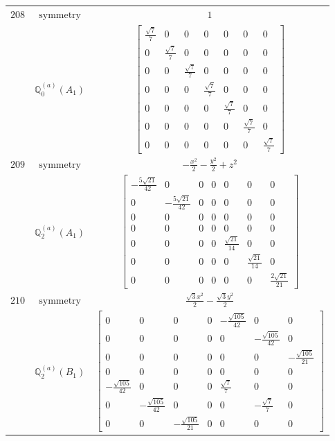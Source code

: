 \documentclass[fleqn,8pt,landscape]{jsarticle}
\begin{document}
\begin{longtable}{ccc}
$ 208 $ & $ \text{symmetry} $ & $ 1 $ \\
$  $ & $ \mathbb{Q}_{0}^{(a)}(A_{1}) $ & $ \begin{bmatrix} \frac{\sqrt{7}}{7} & 0 & 0 & 0 & 0 & 0 & 0 \\ 0 & \frac{\sqrt{7}}{7} & 0 & 0 & 0 & 0 & 0 \\ 0 & 0 & \frac{\sqrt{7}}{7} & 0 & 0 & 0 & 0 \\ 0 & 0 & 0 & \frac{\sqrt{7}}{7} & 0 & 0 & 0 \\ 0 & 0 & 0 & 0 & \frac{\sqrt{7}}{7} & 0 & 0 \\ 0 & 0 & 0 & 0 & 0 & \frac{\sqrt{7}}{7} & 0 \\ 0 & 0 & 0 & 0 & 0 & 0 & \frac{\sqrt{7}}{7} \end{bmatrix} $ \\ \hline
$ 209 $ & $ \text{symmetry} $ & $ - \frac{x^{2}}{2} - \frac{y^{2}}{2} + z^{2} $ \\
$  $ & $ \mathbb{Q}_{2}^{(a)}(A_{1}) $ & $ \begin{bmatrix} - \frac{5 \sqrt{21}}{42} & 0 & 0 & 0 & 0 & 0 & 0 \\ 0 & - \frac{5 \sqrt{21}}{42} & 0 & 0 & 0 & 0 & 0 \\ 0 & 0 & 0 & 0 & 0 & 0 & 0 \\ 0 & 0 & 0 & 0 & 0 & 0 & 0 \\ 0 & 0 & 0 & 0 & \frac{\sqrt{21}}{14} & 0 & 0 \\ 0 & 0 & 0 & 0 & 0 & \frac{\sqrt{21}}{14} & 0 \\ 0 & 0 & 0 & 0 & 0 & 0 & \frac{2 \sqrt{21}}{21} \end{bmatrix} $ \\ \hline
$ 210 $ & $ \text{symmetry} $ & $ \frac{\sqrt{3} x^{2}}{2} - \frac{\sqrt{3} y^{2}}{2} $ \\
$  $ & $ \mathbb{Q}_{2}^{(a)}(B_{1}) $ & $ \begin{bmatrix} 0 & 0 & 0 & 0 & - \frac{\sqrt{105}}{42} & 0 & 0 \\ 0 & 0 & 0 & 0 & 0 & - \frac{\sqrt{105}}{42} & 0 \\ 0 & 0 & 0 & 0 & 0 & 0 & - \frac{\sqrt{105}}{21} \\ 0 & 0 & 0 & 0 & 0 & 0 & 0 \\ - \frac{\sqrt{105}}{42} & 0 & 0 & 0 & \frac{\sqrt{7}}{7} & 0 & 0 \\ 0 & - \frac{\sqrt{105}}{42} & 0 & 0 & 0 & - \frac{\sqrt{7}}{7} & 0 \\ 0 & 0 & - \frac{\sqrt{105}}{21} & 0 & 0 & 0 & 0 \end{bmatrix} $ \\ \hline

\end{longtable}
\end{document}
